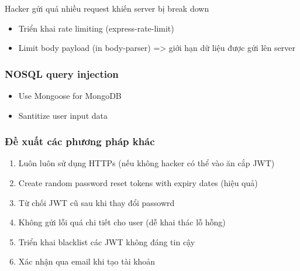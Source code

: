 Hacker gửi quá nhiều request khiến server bị break down

\begin{itemize}
\item Triển khai rate limiting (express-rate-limit)
\item Limit body payload (in body-parser) => giới hạn dữ liệu được gửi lên server
\end{itemize}

\subsubsection{NOSQL query injection}

\begin{itemize}
\item Use Mongoose for MongoDB
\item Santitize user input data
\end{itemize}


\subsubsection{Đề xuất các phương pháp khác}

\begin{enumerate}
\item Luôn luôn sử dụng HTTPs (nếu không hacker có thể vào ăn cắp JWT)
\item Create random password reset tokens with expiry dates (hiệu quả)
\item Từ chối  JWT cũ sau khi thay đổi passowrd
\item Không gửi lỗi quá chi tiết cho user (dễ khai thác lỗ hỗng)
\item Triển khai blacklist các JWT không đáng tin cậy
\item Xác nhận qua email khi tạo tài khoản 
\end{enumerate}




